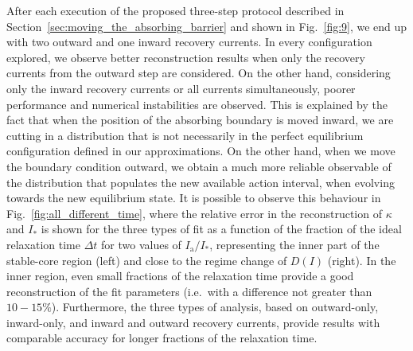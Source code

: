 After each execution of the proposed three-step protocol described in Section~\ref{sec:moving_the_absorbing_barrier} and shown in Fig.~\ref{fig:9}, we end up with two outward and one inward recovery currents. In every configuration explored, we observe better reconstruction results when only the recovery currents from the outward step are considered. On the other hand, considering only the inward recovery currents or all currents simultaneously, poorer performance and numerical instabilities are observed. This is explained by the fact that when the position of the absorbing boundary is moved inward, we are cutting in a distribution that is not necessarily in the perfect equilibrium configuration defined in our approximations. On the other hand, when we move the boundary condition outward, we obtain a much more reliable observable of the distribution that populates the new available action interval, when evolving towards the new equilibrium state. It is possible to observe this behaviour in Fig.~\ref{fig:all_different_time}, where the relative error in the reconstruction of $\kappa$ and $I_\ast$ is shown for the three types of fit as a function of the fraction of the ideal relaxation time $\Delta t$ for two values of $I_\mathrm{a}/I_\ast$, representing the inner part of the stable-core region (left) and close to the regime change of $D(I)$ (right). In the inner region, even small fractions of the relaxation time provide a good reconstruction of the fit parameters {(i.e.\ with a difference not greater than $10-15\%$)}. Furthermore, the three types of analysis, based on outward-only, inward-only, and inward and outward recovery currents, provide results with comparable accuracy for longer fractions of the relaxation time.  
%

